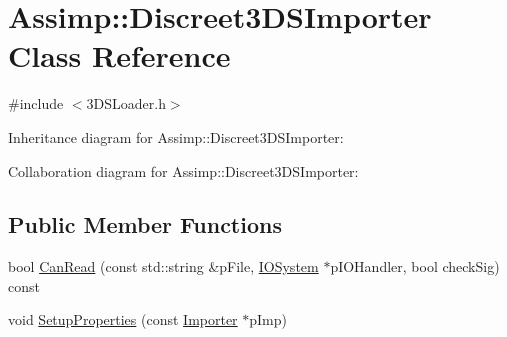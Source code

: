 \hypertarget{class_assimp_1_1_discreet3_d_s_importer}{\section{Assimp\+:\+:Discreet3\+D\+S\+Importer Class Reference}
\label{class_assimp_1_1_discreet3_d_s_importer}
}


{\ttfamily \#include $<$3\+D\+S\+Loader.\+h$>$}



Inheritance diagram for Assimp\+:\+:Discreet3\+D\+S\+Importer\+:


Collaboration diagram for Assimp\+:\+:Discreet3\+D\+S\+Importer\+:
\subsection*{Public Member Functions}
\begin{DoxyCompactItemize}
\item 
bool \hyperlink{class_assimp_1_1_discreet3_d_s_importer_a84b8203d949c065c380da1cf2139b838}{Can\+Read} (const std\+::string \&p\+File, \hyperlink{class_assimp_1_1_i_o_system}{I\+O\+System} $\ast$p\+I\+O\+Handler, bool check\+Sig) const 
\item 
void \hyperlink{class_assimp_1_1_discreet3_d_s_importer_a69c8d30c01af9ac1548a9fcb25ab28ed}{Setup\+Properties} (const \hyperlink{class_assimp_1_1_importer}{Importer} $\ast$p\+Imp)
\end{DoxyCompactItemize}
